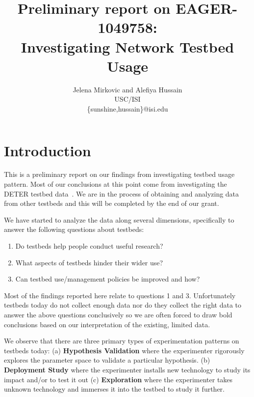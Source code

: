 \documentclass[12pt]{article}
\begin{document}
\normalsize



\clearpage
{}

\title{Preliminary report on EAGER-1049758: 
\\Investigating Network Testbed Usage}
\author{Jelena Mirkovic and Alefiya Hussain \\
USC/ISI\\
\{sunshine,hussain\}@isi.edu
}

\maketitle

\section*{Introduction}
This is a preliminary report on our findings from investigating testbed usage pattern. 
Most of our conclusions at this point come from investigating the DETER
 testbed data~\cite{Deter}. 
We are in the process of obtaining and analyzing data 
 from other testbeds and this will be completed by the end of our grant.

We have started to analyze the data along several dimensions, 
specifically to answer the following questions about testbeds:  
\begin{enumerate} 
\item Do testbeds help people conduct useful research?
\item What aspects of testbeds hinder their wider use?
\item Can testbed use/management policies be improved and how?
\end{enumerate}
Most of the findings reported here relate to questions 1 and 3. Unfortunately testbeds today
do not collect enough data nor do they collect the right data to answer the above questions
conclusively so we are often forced to draw bold conclusions based on our interpretation of the
existing, limited data.

We observe that there are three primary types of experimentation patterns 
 on testbeds today: (a) {\bf Hypothesis Validation} where the experimenter
 rigorously explores the parameter space to validate 
  a particular hypothesis. 
(b) {\bf Deployment Study} where the experimenter 
 installs new technology to study its impact and/or to test it out
(c) {\bf Exploration} where the experimenter takes 
 unknown technology and immerses it into the testbed to study it further.
\end{document}
